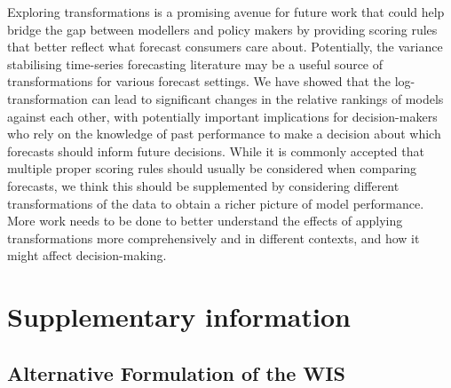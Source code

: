 \documentclass{article}
\begin{document}
Exploring transformations is a promising avenue for future work that could help bridge the gap between modellers and policy makers by providing scoring rules that better reflect what forecast consumers care about. Potentially, the variance stabilising time-series forecasting literature may be a useful source of transformations for various forecast settings. We have showed that the log-transformation can lead to significant changes in the relative rankings of models against each other, with potentially important implications for decision-makers who rely on the knowledge of past performance to make a decision about which forecasts should inform future decisions. While it is commonly accepted that multiple proper scoring rules should usually be considered when comparing forecasts, we think this should be supplemented by considering different transformations of the data to obtain a richer picture of model performance. More work needs to be done to better understand the effects of applying transformations more comprehensively and in different contexts, and how it might affect decision-making. 

\newpage

\appendix
\section{Supplementary information}

\subsection{Alternative Formulation of the WIS}
\label{sec:alternative-wis}
\end{document}
